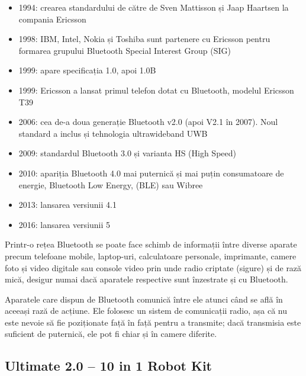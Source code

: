 \documentclass[12pt,a4paper]{article}
\begin{document}
	\begin{itemize}
		\item 1994: crearea standardului de către de Sven Mattisson și Jaap Haartsen la compania Ericsson
		\item 1998: IBM, Intel, Nokia și Toshiba sunt partenere cu Ericsson pentru formarea grupului Bluetooth Special Interest Group (SIG)
		\item 1999: apare specificația 1.0, apoi 1.0B
		\item 1999: Ericsson a lansat primul telefon dotat cu Bluetooth, modelul Ericsson T39
		\item 2006: cea de-a doua generație Bluetooth v2.0 (apoi V2.1 în 2007). Noul standard a inclus și tehnologia ultrawideband UWB
		\item 2009: standardul Bluetooth 3.0 și varianta HS (High Speed)
		\item 2010: apariția Bluetooth 4.0 mai puternică și mai puțin consumatoare de energie, Bluetooth Low Energy, (BLE) sau Wibree
		\item 2013: lansarea versiunii 4.1
		\item 2016: lansarea versiunii 5
	\end{itemize}
	
	\par Printr-o rețea Bluetooth se poate face schimb de informații între diverse aparate precum telefoane mobile, laptop-uri, calculatoare personale, imprimante, camere foto și video digitale sau console video prin unde radio criptate (sigure) și de rază mică, desigur numai dacă aparatele respective sunt înzestrate și cu Bluetooth.
	
	\par Aparatele care dispun de Bluetooth comunică între ele atunci când se află în aceeași rază de acțiune. Ele folosesc un sistem de comunicații radio, așa că nu este nevoie să fie poziționate față în față pentru a transmite; dacă transmisia este suficient de puternică, ele pot fi chiar și în camere diferite.
	
	\subsection{Ultimate 2.0 – 10 in 1 Robot Kit}
	
\end{document}
